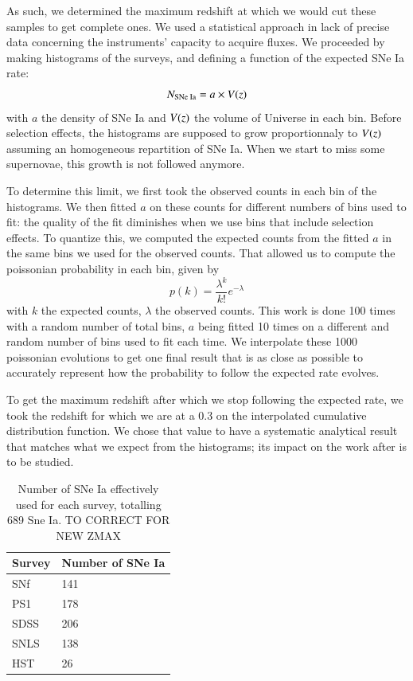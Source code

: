 \documentclass{aa}
\def\l{\lambda}\def\L{\Lambda}
\begin{document}
As such, we determined the maximum redshift at which we would cut these samples
to get complete ones. We used a statistical approach in lack of precise data
concerning the instruments' capacity to acquire fluxes. We proceeded by making
histograms of the surveys, and defining a function of the expected SNe Ia rate:
\begin{equation}
    N_{\text{SNe Ia}} = a \times V(z)
\end{equation}
with $a$ the density of SNe Ia and $V(z)$ the volume of Universe in each bin.
Before selection effects, the histograms are supposed to grow proportionnaly to
$V(z)$ assuming an homogeneous repartition of SNe Ia. When we start to miss some
supernovae, this growth is not followed anymore.

To determine this limit, we first took the observed counts in each bin of the
histograms. We then fitted $a$ on these counts for different numbers of bins
used to fit: the quality of the fit diminishes when we use bins that include
selection effects. To quantize this, we computed the expected counts from the
fitted $a$ in the same bins we used for the observed counts. That allowed us to
compute the poissonian probability in each bin, given by
\begin{equation}
    p(k) = \frac{\l^k}{k!}e^{-\l}
\end{equation}
with $k$ the expected counts, $\l$ the observed counts. This work is done 100
times with a random number of total bins, $a$ being fitted 10 times on a
different and random number of bins used to fit each time. We interpolate these
1000 poissonian evolutions to get one final result that is as close as possible
to accurately represent how the probability to follow the expected rate evolves.

To get the maximum redshift after which we stop following the expected rate, we
took the redshift for which we are at a 0.3 on the interpolated cumulative
distribution function. We chose that value to have a systematic analytical
result that matches what we expect from the histograms; its impact on the work
after is to be studied.

\begin{table}[htbp!]
    \centering
    \caption{Number of SNe Ia effectively used for each survey, totalling 689
    Sne Ia. TO CORRECT FOR NEW ZMAX}
    \label{tab:sample}
    \begin{tabularx}{\linewidth}{|Y*{1}{|Y}|}\hline
         Survey & Number of SNe Ia \\\hline\hline
        SNf & 141 \\\hline
        PS1 & 178 \\\hline
        SDSS & 206 \\\hline
        SNLS & 138 \\\hline
        HST & 26 \\\hline
    \end{tabularx}
\end{table}
\end{document}
